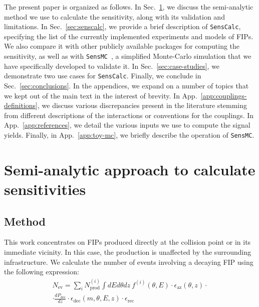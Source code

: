 \documentclass[
    aps,prd,
    twocolumn,
    nofootinbib,
    superscriptaddress,
]{revtex4}
\begin{document}
The present paper is organized as follows. In Sec.~\ref{sec:approach}, we discuss the semi-analytic method we use to calculate the sensitivity, along with its validation and limitations. In Sec.~\ref{sec:senscalc}, we provide a brief description of \texttt{SensCalc}, specifying the list of the currently implemented experiments and models of FIPs. We also compare it with other publicly available packages for computing the sensitivity, as well as with \texttt{SensMC}~\cite{SensMC-GitHub}, a simplified Monte-Carlo simulation that we have specifically developed to validate it. In Sec.~\ref{sec:case-studies}, we demonstrate two use cases for \texttt{SensCalc}. Finally, we conclude in Sec.~\ref{sec:conclusions}.
In the appendices, we expand on a number of topics that we kept out of the main text in the interest of brevity. In App.~\ref{app:couplings-definitions}, we discuss various discrepancies present in the literature stemming from different descriptions of the interactions or conventions for the couplings. In App.~\ref{app:references}, we detail the various inputs we use to compute the signal yields. Finally, in App.~\ref{app:toy-mc}, we briefly describe the operation of \texttt{SensMC}.

\section{Semi-analytic approach to calculate sensitivities}
\label{sec:approach}

\subsection{Method}
\label{sec:method}

This work concentrates on FIPs produced directly at the collision point or in its immediate vicinity. In this case, the production is unaffected by the surrounding infrastructure. We calculate the number of events involving a decaying FIP using the following expression: 
\begin{multline}
    N_{\text{ev}} = \sum_{i}N^{(i)}_{\text{prod}}\int dE d\theta dz \ f^{(i)}(\theta,E)\cdot \epsilon_{\text{az}}(\theta,z) \cdot \\
    \cdot \frac{dP_{\text{dec}}}{dz} \cdot\epsilon_{\text{dec}}(m,\theta,E,z) \cdot \epsilon_{\text{rec}}
    \label{eq:Nevents}
\end{multline}
\end{document}
